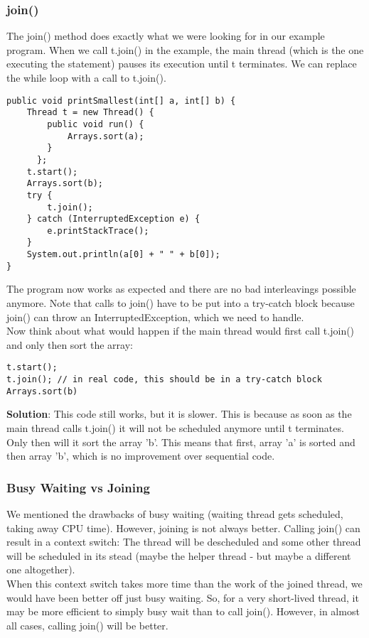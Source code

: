 \documentclass[main.tex]{subfiles}
\begin{document}
\subsubsection{join()}
The join() method does exactly what we were looking for in our example program. When we call t.join() in the example, the main thread (which is the one executing the statement) pauses its execution until t terminates. We can replace the while loop with a call to t.join().
\begin{verbatim}
public void printSmallest(int[] a, int[] b) {
    Thread t = new Thread() {
        public void run() {
            Arrays.sort(a);
        }
      };
    t.start();
    Arrays.sort(b);
    try {
        t.join();
    } catch (InterruptedException e) {
        e.printStackTrace();
    }
    System.out.println(a[0] + " " + b[0]);
}
\end{verbatim}
The program now works as expected and there are no bad interleavings possible anymore. Note that calls to join() have to be put into a try-catch block because join() can throw an InterruptedException, which we need to handle.\\[3mm]
Now think about what would happen if the main thread would first call t.join() and only then sort the array:
\begin{verbatim}
t.start();
t.join(); // in real code, this should be in a try-catch block
Arrays.sort(b)
\end{verbatim}
\textbf{Solution}: This code still works, but it is slower. This is because as soon as the main thread calls t.join() it will not be scheduled anymore until t terminates. Only then will it sort the array 'b'. This means that first, array 'a' is sorted and then array 'b', which is no improvement over sequential code.

\subsubsection{Busy Waiting vs Joining}
We mentioned the drawbacks of busy waiting (waiting thread gets scheduled, taking away CPU time). However, joining is not always better. Calling join() can result in a context switch: The thread will be descheduled and some other thread will be scheduled in its stead (maybe the helper thread - but maybe a different one altogether).\\
When this context switch takes more time than the work of the joined thread, we would have been better off just busy waiting. So, for a very short-lived thread, it may be more efficient to simply busy wait than to call join(). However, in almost all cases, calling join() will be better.
\end{document}
